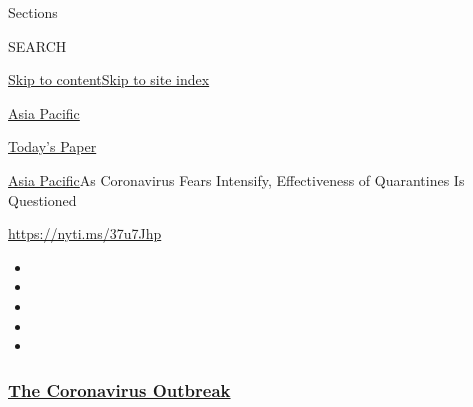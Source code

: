 Sections

SEARCH

\protect\hyperlink{site-content}{Skip to
content}\protect\hyperlink{site-index}{Skip to site index}

\href{https://www.nytimes3xbfgragh.onion/section/world/asia}{Asia
Pacific}

\href{https://myaccount.nytimes3xbfgragh.onion/auth/login?response_type=cookie\&client_id=vi}{}

\href{https://www.nytimes3xbfgragh.onion/section/todayspaper}{Today's
Paper}

\href{/section/world/asia}{Asia Pacific}\textbar{}As Coronavirus Fears
Intensify, Effectiveness of Quarantines Is Questioned

\url{https://nyti.ms/37u7Jhp}

\begin{itemize}
\item
\item
\item
\item
\item
\end{itemize}

\hypertarget{the-coronavirus-outbreak}{%
\subsubsection{\texorpdfstring{\href{https://www.nytimes3xbfgragh.onion/news-event/coronavirus?name=styln-coronavirus-national\&region=TOP_BANNER\&variant=undefined\&block=storyline_menu_recirc\&action=click\&pgtype=Article\&impression_id=f5ee6f00-e3ae-11ea-94af-ff08e013db7e}{The
Coronavirus
Outbreak}}{The Coronavirus Outbreak}}\label{the-coronavirus-outbreak}}

